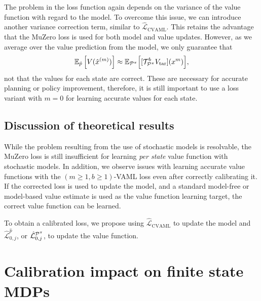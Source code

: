 The problem in the loss function again depends on the variance of the value function with regard to the model.
%
To overcome this issue, we can introduce another variance correction term, similar to $\hat{\mathcal{L}}_\mathrm{CVAML}$. 
This retains the advantage that the MuZero loss is used for both model and value updates.
However, as we average over the value prediction from the model, we only guarantee that 
\begin{align}
\mathbb{E}_{\hat{p}}\left[V(\hat{x}^{(m)})\right] \approx \mathbb{E}_{\P^\pi}\Bigl[[\mathcal{T}_{\P^\pi}^b V_\mathrm{tar}](x^{m})\Bigr],
\end{align}
not that the values for each state are correct.
These are necessary for accurate planning or policy improvement, therefore, it is still important to use a loss variant with $m=0$ for learning accurate values for each state.

\subsection{Discussion of theoretical results}
While the problem resulting from the use of stochastic models is resolvable, the MuZero loss is still insufficient for learning \emph{per state} value function with stochastic models.
In addition, we observe issues with learning accurate value functions with the $(m\geq1,b\geq1)$-VAML loss even after correctly calibrating it.
If the corrected loss is used to update the model, and a standard model-free or model-based value estimate is used as the value function learning target, the correct value function can be learned.

\begin{boxinsight}
    To obtain a calibrated loss, we propose using $\hat{\mathcal{L}}_\mathrm{CVAML}$ to update the model and $\hat{\mathcal{L}}^{\hat{p}}_{0,j}$, or $\hat{\mathcal{L}}^{\P^\pi}_{0,j}$, to update the value function.
\end{boxinsight}

\section{Calibration impact on finite state MDPs}
\label{sec:cvaml:empirical1}

